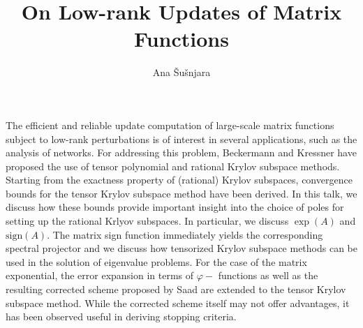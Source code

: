\documentclass{article}
\title{On Low-rank Updates of Matrix Functions}
\author{Ana \v{S}u\v{s}njara}
\affil{PhD student at EPF Lausanne}
\date{}
\begin{document}
\maketitle

\setcounter{page}{12}
The efficient and reliable update computation of large-scale matrix functions subject to low-rank perturbations is of interest in several applications, such as the analysis of networks. For addressing this problem, Beckermann and Kressner have proposed the use of tensor polynomial and rational Krylov subspace methods. Starting from the exactness property of (rational) Krylov subspaces, convergence bounds for the tensor Krylov subspace method have been derived. In this talk, we discuss how these bounds provide important insight into the choice of poles for setting up the rational Krlyov subspaces. In particular, we discuss $\exp(A)$ and $\textrm{sign}(A)$. The matrix sign function immediately yields the corresponding spectral projector and we discuss how tensorized Krylov subspace methods can be used in the solution of eigenvalue problems. For the case of the matrix exponential, the error expansion in terms of $\varphi-$ functions as well as the resulting corrected scheme proposed by Saad are extended to the tensor Krylov subspace method. While the corrected scheme itself may not offer advantages, it has been observed useful in deriving stopping criteria.  
\end{document}
